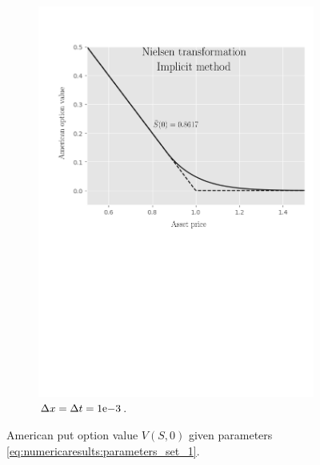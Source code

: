 \begin{figure}[tbp]
\begin{subfigure}{0.4\textwidth}
    \includegraphics[width=\textwidth]{chapters/chapter3/TestCase2NielsenImplicit.pdf}
    \caption{$\Delta{x}=\Delta{t}={1}\mathrm{e}{-3}$.}
  \end{subfigure}
  \caption{American put option value $V(S, 0)$ given parameters \eqref{eq:numericaresults:parameters_set_1}.}
  \label{fig:finitedifferencesschemes:numericaresults:test_case_2}
\end{figure}

